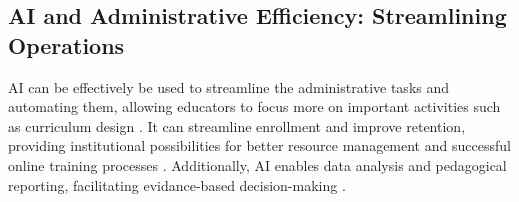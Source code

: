 

\subsection{AI and Administrative Efficiency: Streamlining Operations}
AI can be effectively be used to streamline the administrative tasks and automating them, allowing educators
to focus more on important activities such as curriculum design \citep{drach_use_2023}. It can streamline enrollment
and improve retention, providing institutional possibilities for better 
resource management and successful online training processes \citep{lukianets_promises_2023}. Additionally, AI enables data analysis and 
pedagogical reporting, facilitating evidance-based decision-making \citep{guerrero-quinonez_artificial_2023}.

